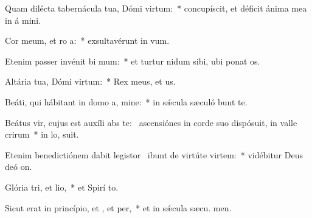 \item Quam dilécta tabernácula tua, Dómi virtum:~* concupíscit, et déficit ánima mea in á mini.
\item Cor meum, et ro a:~* exsultavérunt in  vum.
\item Etenim passer invénit bi mum:~* et turtur nidum sibi, ubi ponat  os.
\item Altária tua, Dómi virtum:~* Rex meus, et  us.
\item Beáti, qui hábitant in domo a, mine:~* in sǽcula sæculó bunt te.
\item Beátus vir, cujus est auxíli abs te:~\pscross{} ascensiónes in corde suo dispósuit, in valle crirum~* in lo,  suit.
\item Etenim benedictiónem dabit legistor~\pscross{} ibunt de virtúte  virtem:~* vidébitur Deus deó  on.
\item Glória tri, et lio,~* et Spirí to.
\item Sicut erat in princípio, et , et per,~* et in sǽcula sæcu. men.
